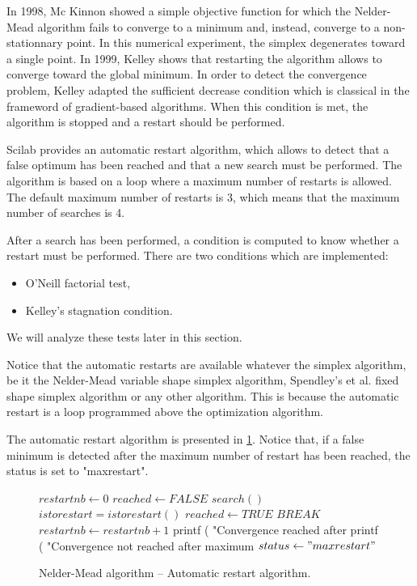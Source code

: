 In 1998, Mc Kinnon \cite{589109} showed a simple objective function 
for which the Nelder-Mead algorithm fails to converge to a minimum and, instead, 
converge to a non-stationnary point. In this numerical experiment, the simplex 
degenerates toward a single point. In 1999, Kelley \cite{589283} shows that 
restarting the algorithm allows to converge toward the global minimum.
In order to detect the convergence problem, Kelley adapted the sufficient decrease 
condition which is classical in the frameword of gradient-based algorithms.
When this condition is met, the algorithm is stopped and a restart should be performed.

Scilab provides an automatic restart algorithm, which allows to detect 
that a false optimum has been reached and that a new search must be performed.
The algorithm is based on a loop where a maximum number of restarts 
is allowed. The default maximum number of restarts is 3, which means that the maximum
number of searches is 4. 

After a search has been performed, a condition is computed to know whether a restart
must be performed. There are two conditions which are implemented:
\begin{itemize}
\item O'Neill factorial test,
\item Kelley's stagnation condition.
\end{itemize}
We will analyze these tests later in this section.

Notice that the automatic restarts are available whatever the simplex algorithm,
be it the Nelder-Mead variable shape simplex algorithm, Spendley's et al. fixed shape 
simplex algorithm or any other algorithm. This is because the 
automatic restart is a loop programmed above the optimization algorithm.

The automatic restart algorithm is presented in \ref{algo-automaticrestart}.
Notice that, if a false minimum is detected after the maximum number of restart has been reached,
the status is set to "maxrestart".

\begin{figure}[htbp]
\begin{algorithmic}
\STATE $restartnb \gets 0$
\STATE $reached \gets FALSE$
  \STATE $search()$
  \STATE $istorestart = istorestart ()$
    \STATE $reached \gets TRUE$ 
    \STATE $BREAK$
  \ENDIF
    \STATE $restartnb \gets restartnb + 1$ 
  \ENDIF
\ENDFOR
{}
  \STATE printf ( "Convergence reached after %
\ELSE
  \STATE printf ( "Convergence not reached after maximum %
  \STATE $status \gets "maxrestart"$
\ENDIF
\end{algorithmic}
\caption{Nelder-Mead algorithm -- Automatic restart algorithm.}
\label{algo-automaticrestart}
\end{figure}

